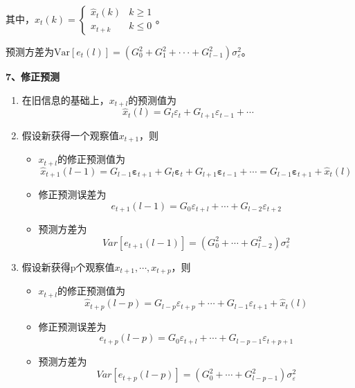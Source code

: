 \documentclass[12pt, a4paper, oneside]{ctexbook}
\begin{document}
其中，$\hat{x}_t(k) = \begin{cases}
        \hat{x}_t(k) & k \geq 1 \\
        x_{t+k}      & k \leq 0
    \end{cases}$。

预测方差为$\mathrm{Var}[e_t(l)]{=}(G_0^2+G_1^2+\cdotp\cdotp\cdotp+G_{l-1}^2)\sigma_\varepsilon^2$。

\textbf{7、修正预测}
\begin{enumerate}[1、]
    \item 在旧信息的基础上，$x_{t+l}$的预测值为
          \begin{equation*}
              \hat{x}_t(l)=G_l\varepsilon_t+G_{l+1}\varepsilon_{t-1}+\cdots
          \end{equation*}
    \item 假设新获得一个观察值$x_{t+1}$，则
          \begin{itemize}
              \item $x_{t+l}$的修正预测值为
                    \begin{equation*}
                        \hat{x}_{t+1}(l-1)=G_{l-1}\boldsymbol{\varepsilon}_{t+1}+G_l\boldsymbol{\varepsilon}_t+G_{l+1}\boldsymbol{\varepsilon}_{t-1}+\cdots=G_{l-1}\boldsymbol{\varepsilon}_{t+1}+\hat{x}_t(l)
                    \end{equation*}
              \item 修正预测误差为
                    $$
                        e_{t+1}(l-1)=G_0\varepsilon_{t+l}+\cdots+G_{l-2}\varepsilon_{t+2}
                    $$
              \item 预测方差为
                    $$
                        Var[e_{t+1}(l-1)]=(G_0^2+\cdots+G_{l-2}^2)\sigma_\varepsilon^2
                    $$
          \end{itemize}
    \item 假设新获得p个观察值$x_{t+1},\cdots,x_{t+p}$，则
          \begin{itemize}
              \item $x_{t+l}$的修正预测值为
                    \begin{equation}
                        \hat{x}_{t+p}(l-p)=G_{l-p}\varepsilon_{t+p}+\cdots+G_{l-1}\varepsilon_{t+1}+\hat{x}_t(l)
                    \end{equation}
              \item 修正预测误差为
                    \begin{equation}
                        e_{t+p}(l-p)=G_0\varepsilon_{t+l}+\cdots+G_{l-p-1}\varepsilon_{t+p+1}
                    \end{equation}
              \item 预测方差为
                    \begin{equation}
                        Var[e_{t+p}(l-p)]=(G_0^2+\cdots+G_{l-p-1}^2)\sigma_\varepsilon^2
                    \end{equation}
          \end{itemize}
\end{enumerate}
\end{document}
